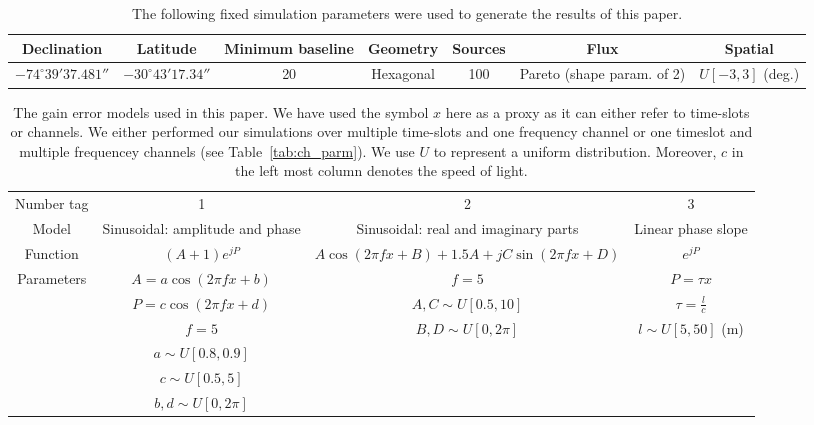 \documentclass[useAMS,usenatbib]{mn2e}
\begin{document}
\begin{table}
\centering
\caption{The following fixed simulation parameters were used to generate the results of this paper.}
\begin{tabular}{|c c c c c c c|} 
\hline
Declination & Latitude & Minimum baseline & Geometry& Sources & Flux & Spatial \\
\hline 
\hline
 $-74^{\circ}39'37.481''$ & $-30^{\circ}43'17.34''$ & 20 & Hexagonal &100 & Pareto (shape param. of 2) & $U[-3,3]$ (deg.) 
\end{tabular}
\label{tab:fixed_parm}
\end{table}

\begin{table}
\centering
\caption{The gain error models used in this paper. We have used the symbol $x$ here as a proxy as it can either refer to time-slots or channels. We either
performed our simulations over multiple time-slots and one frequency channel or one timeslot and multiple frequencey channels (see Table~\ref{tab:ch_parm}). We use $U$ to represent 
a uniform distribution. Moreover, $c$ in the left most column denotes the speed of light.}
\begin{tabular}{|c c c c|} 
\hline
Number tag & 1 & 2 & 3\\
Model & Sinusoidal: amplitude and phase & Sinusoidal: real and imaginary parts & Linear phase slope \\ [0.5ex] 
\hline\hline
Function & $(A+1)e^{jP}$ & $A\cos(2\pi fx+B)+1.5A+jC\sin(2\pi fx+D)$ & $e^{jP}$ \\ 
\hline
Parameters & $A=a\cos(2\pi fx +b)$  & $f=5$ & $P=\tau x$ \\
 & $P =c \cos(2\pi fx +d)$ & $A,C\sim U[0.5,10]$ & $\tau = \frac{l}{c}$ \\
 & $f=5$ & $B,D\sim U[0,2\pi]$ &  $l\sim U[5,50]$ (m)\\
 & $a\sim U[0.8,0.9]$ &  & \\ 
 & $c\sim U[0.5,5]$ &  &  \\ 
 & $b,d\sim U[0,2\pi]$ &  &  \\ 
\hline
\end{tabular}
\label{tab:gain_parm}
\end{table}
\end{document}
